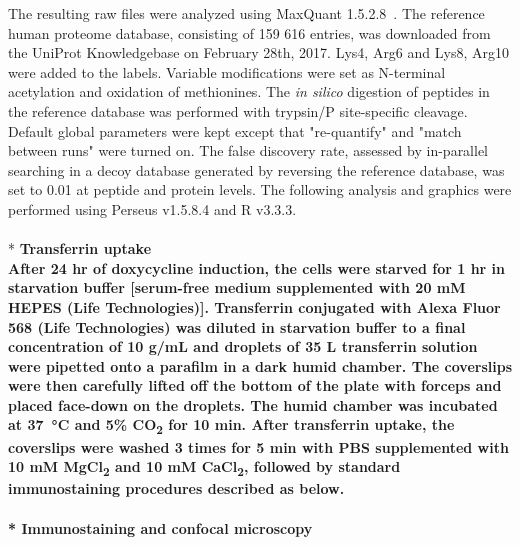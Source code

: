 The resulting raw files were analyzed using MaxQuant 1.5.2.8~\cite{Cox}. The reference human proteome database, consisting of 159 616 entries, was downloaded from the UniProt Knowledgebase on February 28th, 2017. Lys4, Arg6 and Lys8, Arg10 were added to the labels. Variable modifications were set as N-terminal acetylation and oxidation of methionines. The \textit{in silico} digestion of peptides in the reference database was performed with trypsin/P site-specific cleavage. Default global parameters were kept except that "re-quantify" and "match between runs" were turned on. The false discovery rate, assessed by in-parallel searching in a decoy database generated by reversing the reference database, was set to 0.01 at peptide and protein levels. The following analysis and graphics were performed using Perseus v1.5.8.4 and R v3.3.3.
\\
\\*
\bfseries{Transferrin uptake}\\
\normalfont After 24 hr of doxycycline induction, the cells were starved for 1 hr in starvation buffer [serum-free medium supplemented with 20 mM HEPES (Life Technologies)]. Transferrin conjugated with Alexa Fluor 568 (Life Technologies) was diluted in starvation buffer to a final concentration of 10 {}\textmu g/mL and droplets of 35 {}\textmu L transferrin solution were pipetted onto a parafilm in a dark humid chamber. The coverslips were then carefully lifted off the bottom of the plate with forceps and placed face-down on the droplets. The humid chamber was incubated at \SI{37}{\celsius} and 5\% CO\textsubscript{2} for 10 min. After transferrin uptake, the coverslips were washed 3 times for 5 min with PBS supplemented with 10 mM MgCl\textsubscript{2} and 10 mM CaCl\textsubscript{2}, followed by standard immunostaining procedures described as below.
\\
\\*
\bfseries{Immunostaining and confocal microscopy}\\
